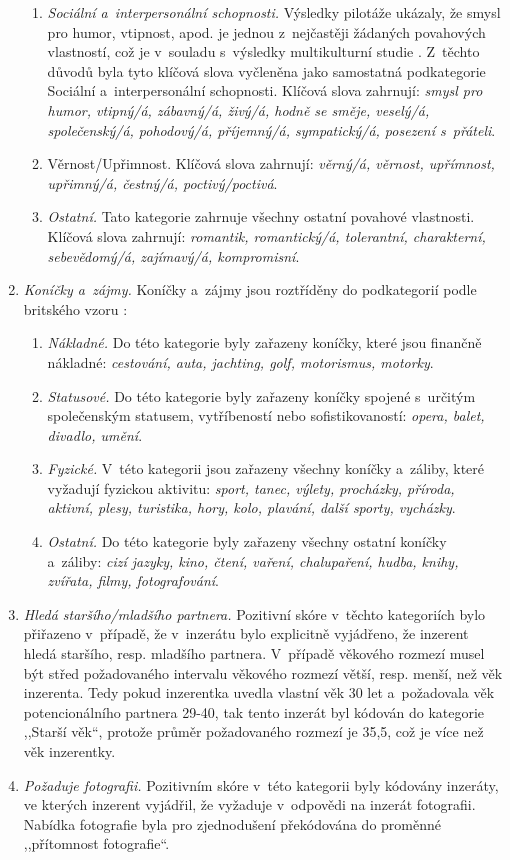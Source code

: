 \documentclass[a4paper, 12pt, notitlepage, oneside, numbers=noenddot]{report}
\begin{document}
\begin{enumerate}
\begin{enumerate}
\item \emph{Sociální a~interpersonální schopnosti.} Výsledky pilotáže
  ukázaly, že smysl pro humor, vtipnost, apod. je jednou z~nejčastěji
  žádaných povahových vlastností, což je v~souladu s~výsledky
  multikulturní studie \citep{BussEtAl1990}.  Z~těchto důvodů byla
  tyto klíčová slova vyčleněna jako samostatná podkategorie Sociální
  a~interpersonální schopnosti. Klíčová slova zahrnují: \emph{smysl
    pro humor, vtipný/á, zábavný/á, živý/á, hodně se směje, veselý/á,
    společenský/á, pohodový/á, pří\-jemný/á, sympatický/á, posezení
    s~přáteli}.
\item Věrnost/Upřimnost. Klíčová slova zahrnují: \emph{věrný/á, věrnost,
  upřímnost, u\-přimný/á, čestný/á, poctivý/poctivá}.
\item \emph{Ostatní.} Tato kategorie zahrnuje všechny ostatní povahové
  vlastnosti. Klíčová slova zahrnují: \emph{romantik, romantický/á,
  tolerantní, charakterní, sebevědomý/á, zajímavý/á, kompromisní}.
\end{enumerate}
\item \emph{Koníčky a~zájmy.} Koníčky a~zájmy jsou roztříděny do podkategorií
  podle britského vzoru \citep{GreenlessMcGrew1994}:

\begin{enumerate}
\item \emph{Nákladné.} Do této kategorie byly zařazeny koníčky, které jsou
  finančně nákladné: \emph{cestování, auta, jachting, golf,
    motorismus, motorky}.
\item \emph{Statusové.} Do této kategorie byly zařazeny koníčky spojené
  s~určitým spole\-čen\-ským statusem, vytříbeností nebo sofistikovaností:
  \emph{opera, balet, divadlo, umění}.
\item \emph{Fyzické.} V~této kategorii jsou zařazeny všechny koníčky
  a~záliby, které vyžadují fyzickou aktivitu: \emph{sport, tanec,
    výlety, procházky, příroda, aktivní, plesy, turistika, hory, kolo,
    plavání, další sporty, vycházky}.
\item \emph{Ostatní.} Do této kategorie byly zařazeny všechny ostatní koníčky
  a~záliby: \emph{cizí jazyky, kino, čtení, vaření, chalupaření,
    hudba, knihy, zvířata, filmy, fotografování}.
\end{enumerate}
\item \emph{Hledá staršího/mladšího partnera.}  Pozitivní skóre v~těchto
  kategoriích bylo přiřazeno v~případě, že v~inzerátu bylo explicitně
  vyjádřeno, že inzerent hledá staršího, resp. mladšího partnera.
  V~případě věkového rozmezí musel být střed požadovaného intervalu
  věkového rozmezí větší, resp. menší, než věk inzerenta.  Tedy pokud
  inzerentka uvedla vlastní věk 30 let a~požadovala věk
  potencionálního partnera 29-40, tak tento inzerát byl kódován do
  kategorie ,,Starší věk``, protože průměr požadovaného rozmezí je
  35,5, což je více než věk inzerentky.
\item \emph{Požaduje fotografii.} Pozitivním skóre v~této kategorii byly
  kódovány inzeráty, ve kterých inzerent vyjádřil, že vyžaduje
  v~odpovědi na inzerát fotografii.  Nabídka fotografie byla pro
  zjednodušení překódována do proměnné ,,přítomnost fotografie``.
\end{enumerate}
\end{document}
